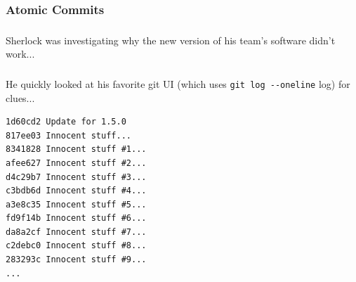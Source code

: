 
\subsubsection{Atomic Commits}

{
\begin{frame}[plain]
  \frametitle{\insertsubsubsection}

  \vspace*{.6\textheight}
  \begin{center}\color{White}
    \Large{Sherlock was investigating why the new version of his team's software didn't work...}
  \end{center}

\end{frame}
}


\begin{frame}[fragile]
  \frametitle{\insertsubsubsection}

    He quickly looked at his favorite git UI (which uses \texttt{git log -{}-oneline} log) for clues...\\\vspacing

  \begin{small}
\begin{verbatim}
1d60cd2 Update for 1.5.0
817ee03 Innocent stuff...
8341828 Innocent stuff #1...
afee627 Innocent stuff #2...
d4c29b7 Innocent stuff #3...
c3bdb6d Innocent stuff #4...
a3e8c35 Innocent stuff #5...
fd9f14b Innocent stuff #6...
da8a2cf Innocent stuff #7...
c2debc0 Innocent stuff #8...
283293c Innocent stuff #9...
...
\end{verbatim}
  \end{small}

\end{frame}

